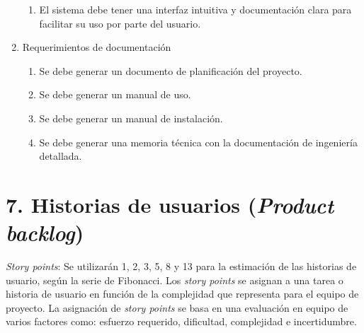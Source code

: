 \documentclass[
11pt, %
]{charter}
\begin{document}
\begin{enumerate}
\begin{enumerate}
			\item El sistema debe tener una interfaz intuitiva y documentación clara para facilitar su uso por parte del usuario.
		\end{enumerate}	
	\item Requerimientos de documentación
		\begin{enumerate}
			\item Se debe generar un documento de planificación del proyecto.
			\item Se debe generar un manual de uso.
			\item Se debe generar un manual de instalación.
			\item Se debe generar una memoria técnica con la documentación de ingeniería detallada.			
		\end{enumerate}
\end{enumerate}

\section{7. Historias de usuarios (\textit{Product backlog})}
\label{sec:backlog}

\textit{Story points}: Se utilizarán 1, 2, 3, 5, 8 y 13 para la estimación de las historias de usuario, según la
serie de Fibonacci.
Los \textit{story points} se asignan a una tarea o historia de usuario en función de la complejidad que representa para el equipo de proyecto. La asignación de \textit{story points} se basa en una evaluación en equipo de varios factores como: esfuerzo requerido, dificultad, complejidad e incertidumbre.
\end{document}
